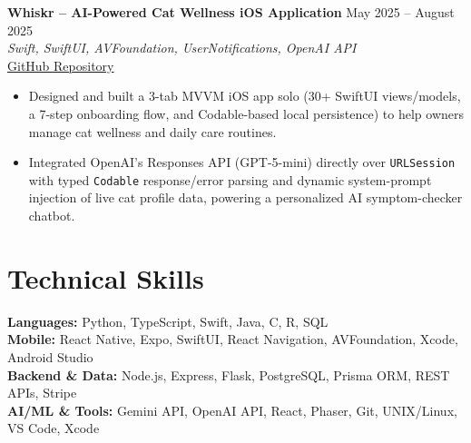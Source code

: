 \documentclass[10pt,letterpaper]{article}
\begin{document}
\textbf{Whiskr -- AI-Powered Cat Wellness iOS Application} \hfill May 2025 -- August 2025\\
\textit{Swift, SwiftUI, AVFoundation, UserNotifications, OpenAI API}\\
\href{https://github.com/VanshParikh1/Whiskr}{GitHub Repository}
\begin{itemize}
    \item Designed and built a 3-tab MVVM iOS app solo (30+ SwiftUI views/models, a 7-step onboarding flow, and Codable-based local persistence) to help owners manage cat wellness and daily care routines.
    \item Integrated OpenAI's Responses API (GPT-5-mini) directly over \texttt{URLSession} with typed \texttt{Codable} response/error parsing and dynamic system-prompt injection of live cat profile data, powering a personalized AI symptom-checker chatbot.
\end{itemize}
\section*{Technical Skills}
\textbf{Languages:} Python, TypeScript, Swift, Java, C, R, SQL\\
\textbf{Mobile:} React Native, Expo, SwiftUI, React Navigation, AVFoundation, Xcode, Android Studio\\
\textbf{Backend \& Data:} Node.js, Express, Flask, PostgreSQL, Prisma ORM, REST APIs, Stripe\\
\textbf{AI/ML \& Tools:} Gemini API, OpenAI API, React, Phaser, Git, UNIX/Linux, VS Code, Xcode
\end{document}
